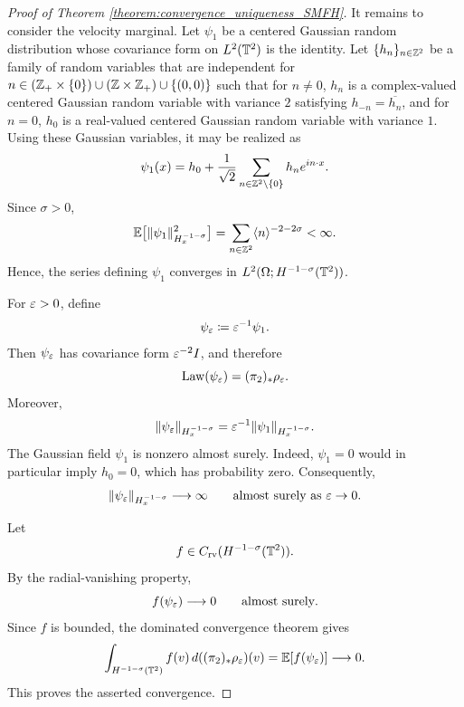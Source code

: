 \begin{proof}[Proof of Theorem \ref{theorem:convergence_uniqueness_SMFH}]
    It remains to consider the velocity marginal. Let
    \(\psi_1\) be a centered Gaussian random distribution whose
    covariance form on \(L^2(\mathbb{T}^2)\) is the identity. 
    Let $\{h_n\}_{n \in \mathbb{Z}^2}$ be a family of random variables that are independent for $n \in (\mathbb{Z}_+\times \{0\}) \cup (\mathbb{Z}\times \mathbb{Z}_+) \cup\{(0, 0)\}$ such that for $n \neq 0$, $h_n$ is a complex-valued centered Gaussian random variable with variance $2$ satisfying $h_{-n} = \overline{h_n}$, and for $n = 0$, $h_0$ is a real-valued centered Gaussian random variable with variance $1$.
    Using these Gaussian variables, it may be realized as
    \[
        \psi_1(x)
        =
        h_0
        +
        \frac{1}{\sqrt{2}}
        \sum_{n\in\mathbb{Z}^2\setminus\{0\}}
        h_ne^{in\cdot x}.
    \]
    Since \(\sigma>0\),
    \[
        \mathbb E\big[
            \|\psi_1\|_{H^{-1-\sigma}_x}^2
        \big]
        =
        \sum_{n\in\mathbb{Z}^2}
        \langle n\rangle^{-2-2\sigma}
        <\infty.
    \]
    Hence, the series defining \(\psi_1\) converges in
    \(L^2(\Omega;H^{-1-\sigma}(\mathbb{T}^2))\).

    For \(\varepsilon>0\), define
    \[
        \psi_\varepsilon\coloneqq\varepsilon^{-1}\psi_1.
    \]
    Then \(\psi_\varepsilon\) has covariance form \(\varepsilon^{-2}I\), and
    therefore
    \[
        \operatorname{Law}(\psi_\varepsilon)
        =
        (\pi_2)_*\rho_\varepsilon.
    \]
    Moreover,
    \[
        \|\psi_\varepsilon\|_{H^{-1-\sigma}_x}
        =
        \varepsilon^{-1}
        \|\psi_1\|_{H^{-1-\sigma}_x}.
    \]
    The Gaussian field \(\psi_1\) is nonzero almost surely. Indeed,
    \(\psi_1=0\) would in particular imply \(h_0=0\), which has
    probability zero. Consequently,
    \[
        \|\psi_\varepsilon\|_{H^{-1-\sigma}_x}
        \longrightarrow\infty
        \qquad\text{almost surely as }\varepsilon\to0.
    \]

    Let
    \[
        f\in
        C_{\mathrm{rv}}
        (H^{-1-\sigma}(\mathbb{T}^2)).
    \]
    By the radial-vanishing property,
    \[
        f(\psi_\varepsilon)\longrightarrow0
        \qquad\text{almost surely}.
    \]
    Since \(f\) is bounded, the dominated convergence theorem gives
    \begin{align*}
        \int_{H^{-1-\sigma}(\mathbb{T}^2)}
        f(v)\,d((\pi_2)_*\rho_\varepsilon)(v)
        = \mathbb E[f(\psi_\varepsilon)]
        \longrightarrow0.
    \end{align*}
    This proves the asserted convergence.
\end{proof}